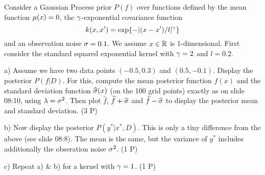 

Consider a Gaussian Process prior $P(f)$ over functions defined by the
mean function $\mu(x)=0$, the $\gamma$-exponential covariance function
$$k(x,x') = \exp\{-|(x-x')/l|^\gamma\}$$ and an observation noise
$\sigma=0.1$. We assume $x\in{\mathbb{R}}$ is 1-dimensional. First consider the standard
squared exponential kernel with $\gamma=2$ and $l=0.2$.


a) Assume we have two data points $(-0.5,0.3)$ and
$(0.5,-0.1)$. Display the posterior $P(f|D)$. For this, compute the
mean posterior function $\hat f(x)$ and the standard deviation
function $\widehat{\sigma}(x)$ (on the 100 grid points) exactly as on slide
08:10, using $\lambda=\sigma^2$. Then plot $\hat f$, $\widehat f +\widehat{\sigma}$ and $\widehat
f-\widehat {\sigma}$ to display the posterior mean and standard deviation. (3 P)

b) Now display the posterior $P(y^*|x^*,D)$. This is only a tiny
difference from the above (see slide 08:8). The mean is the same, but
the variance of $y^*$ includes additionally the obseration noise
$\sigma^2$. (1 P)


c) Repeat a) \& b) for a kernel with $\gamma=1$. (1 P)



\exerfoot
